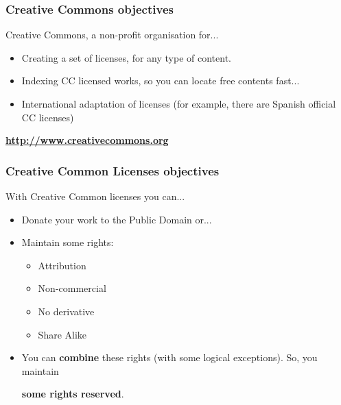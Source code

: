 \documentclass{beamer}
\begin{document}

\begin{frame}
\frametitle{Creative Commons objectives}

Creative Commons, a non-profit organisation for...

\begin{itemize}
\item Creating a set of licenses, for any type of content.
\item Indexing CC licensed works, so you can locate free contents fast...
\item International adaptation of licenses (for example, there are
  Spanish official CC licenses)
\end{itemize}
\vspace{1cm}
\begin{center}
{\LARGE
\textbf{\url{http://www.creativecommons.org}}
}
\end{center}

\end{frame}


\begin{frame}
\frametitle{Creative Common Licenses objectives}

With Creative Common licenses you can...

\begin{itemize}
\item Donate your work to the Public Domain or...
\item Maintain some rights:
\begin{itemize}
\item Attribution
\item Non-commercial
\item No derivative
\item Share Alike
\end{itemize}
\item You can {\bf combine} these rights (with some logical exceptions). So, you maintain
\begin{center}
{\LARGE{\bf some rights reserved}}.
\end{center}
\end{itemize}

\end{frame}

\end{document}
